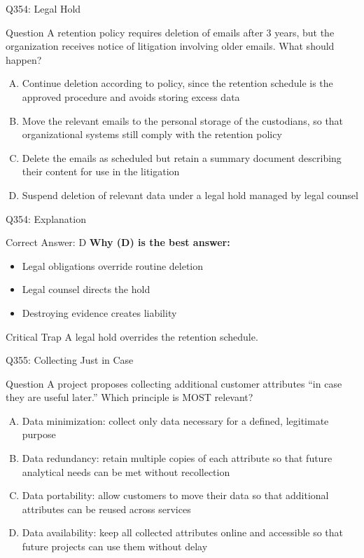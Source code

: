 \documentclass{beamer}
\begin{document}
	\begin{frame}{Q354: Legal Hold}
		\begin{block}{Question}
			\small A retention policy requires deletion of emails after 3 years, but the organization receives notice of litigation involving older emails. What should happen?
		\end{block}
		\begin{enumerate}[(A)]
			\footnotesize
			\item Continue deletion according to policy, since the retention schedule is the approved procedure and avoids storing excess data
			\item Move the relevant emails to the personal storage of the custodians, so that organizational systems still comply with the retention policy
			\item Delete the emails as scheduled but retain a summary document describing their content for use in the litigation
			\item Suspend deletion of relevant data under a legal hold managed by legal counsel
		\end{enumerate}
	\end{frame}
	
	\begin{frame}{Q354: Explanation}
		\begin{block}{Correct Answer: D}
			\textbf{Why (D) is the best answer:}
			\begin{itemize}
				\item Legal obligations override routine deletion
				\item Legal counsel directs the hold
				\item Destroying evidence creates liability
			\end{itemize}
		\end{block}
		\begin{alertblock}{Critical Trap}
			A legal hold overrides the retention schedule.
		\end{alertblock}
	\end{frame}
	
	\begin{frame}{Q355: Collecting Just in Case}
		\begin{block}{Question}
			\small A project proposes collecting additional customer attributes ``in case they are useful later.'' Which principle is MOST relevant?
		\end{block}
		\begin{enumerate}[(A)]
			\footnotesize
			\item Data minimization: collect only data necessary for a defined, legitimate purpose
			\item Data redundancy: retain multiple copies of each attribute so that future analytical needs can be met without recollection
			\item Data portability: allow customers to move their data so that additional attributes can be reused across services
			\item Data availability: keep all collected attributes online and accessible so that future projects can use them without delay
		\end{enumerate}
	\end{frame}
	
\end{document}
